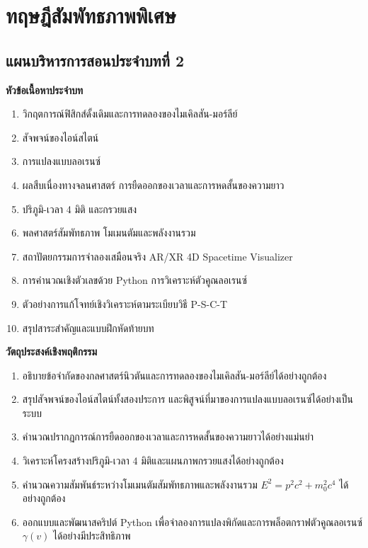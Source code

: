 \chapter{ทฤษฎีสัมพัทธภาพพิเศษ}
\label{chap:special_relativity}

\section*{แผนบริหารการสอนประจำบทที่ 2}

\begin{lessonplanbox}
\noindent\textbf{หัวข้อเนื้อหาประจำบท}
\begin{enumerate}
    \item วิกฤตการณ์ฟิสิกส์ดั้งเดิมและการทดลองของไมเคิลสัน-มอร์ลีย์
    \item สัจพจน์ของไอน์สไตน์
    \item การแปลงแบบลอเรนซ์
    \item ผลสืบเนื่องทางจลนศาสตร์ การยืดออกของเวลาและการหดสั้นของความยาว
    \item ปริภูมิ-เวลา 4 มิติ และกรวยแสง
    \item พลศาสตร์สัมพัทธภาพ โมเมนตัมและพลังงานรวม
    \item สถาปัตยกรรมการจำลองเสมือนจริง AR/XR 4D Spacetime Visualizer
    \item การคำนวณเชิงตัวเลขด้วย Python การวิเคราะห์ตัวคูณลอเรนซ์
    \item ตัวอย่างการแก้โจทย์เชิงวิเคราะห์ตามระเบียบวิธี P-S-C-T
    \item สรุปสาระสำคัญและแบบฝึกหัดท้ายบท
\end{enumerate}

\vspace{0.4em}
\noindent\textbf{วัตถุประสงค์เชิงพฤติกรรม}
\begin{enumerate}
    \item อธิบายข้อจำกัดของกลศาสตร์นิวตันและการทดลองของไมเคิลสัน-มอร์ลีย์ได้อย่างถูกต้อง
    \item สรุปสัจพจน์ของไอน์สไตน์ทั้งสองประการ และพิสูจน์ที่มาของการแปลงแบบลอเรนซ์ได้อย่างเป็นระบบ
    \item คำนวณปรากฏการณ์การยืดออกของเวลาและการหดสั้นของความยาวได้อย่างแม่นยำ
    \item วิเคราะห์โครงสร้างปริภูมิ-เวลา 4 มิติและแผนภาพกรวยแสงได้อย่างถูกต้อง
    \item คำนวณความสัมพันธ์ระหว่างโมเมนตัมสัมพัทธภาพและพลังงานรวม $E^2 = p^2 c^2 + m_0^2 c^4$ ได้อย่างถูกต้อง
    \item ออกแบบและพัฒนาสคริปต์ Python เพื่อจำลองการแปลงพิกัดและการพล็อตกราฟตัวคูณลอเรนซ์ $\gamma(v)$ ได้อย่างมีประสิทธิภาพ
\end{enumerate}


\end{lessonplanbox}
